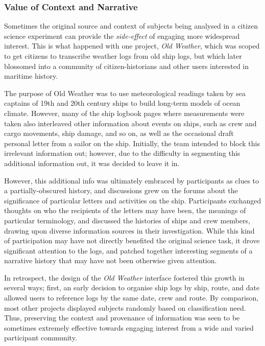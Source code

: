 \documentclass{sigchi}
\begin{document}

\subsubsection{Value of Context and Narrative}
Sometimes the original source and context of subjects being analysed in a citizen science experiment can provide the \emph{side-effect} of engaging more widespread interest. This is what happened with one project, \emph{Old Weather}, which was scoped to get citizens to transcribe weather logs from old ship logs, but which later blossomed into a community of citizen-historians and other users interested in maritime history. 

The purpose of Old Weather was to use meteorological readings taken by sea captains of 19th and 20th century ships to build long-term models of ocean climate. However, many of the ship logbook pages where measurements were taken also interleaved other information about events on ships, such as crew and cargo movements, ship damage, and so on, as well as the occasional draft personal letter from a sailor on the ship.  Initially, the team intended to block this irrelevant information out; however, due to the difficulty in segmenting this additional information out, it was decided to leave it in. 

However, this additional info was ultimately embraced by participants as clues to a partially-obscured history, and discussions grew on the forums about the significance of particular letters and activities on the ship.  Participants exchanged thoughts on who the recipients of the letters may have been, the meanings of particular terminology, and discussed the histories of ships and crew members, drawing upon diverse information sources in their investigation. While this kind of participation may have not directly benefited the original science task, it drove significant attention to the logs, and patched together interesting segments of a narrative history that may have not been otherwise given attention.  %

In retrospect, the design of the \emph{Old Weather} interface fostered this growth in several ways; first, an early decision to organise ship logs by ship, route, and date allowed users to reference logs by the same date, crew and route. By comparison, most other projects displayed subjects randomly based on classification need. Thus, preserving the context and provenance of information was seen to be sometimes extremely effective towards engaging interest from a wide and varied participant community.
\end{document}
